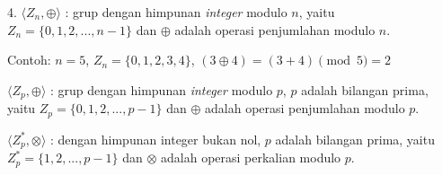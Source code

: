 \documentclass{article}
\begin{document}

4. $\langle Z_n, \oplus \rangle$ : grup dengan himpunan \textit{integer} modulo $n$, yaitu $Z_n = \{0, 1, 2, ..., n - 1\}$ dan $\oplus$ adalah operasi penjumlahan modulo $n$.

Contoh: $n = 5$, $Z_n = \{0, 1, 2, 3, 4\}$, $(3 \oplus 4) = (3 + 4) \pmod 5 = 2$

$\langle Z_p, \oplus \rangle$ : grup dengan himpunan \textit{integer} modulo $p$, $p$ adalah bilangan prima, yaitu $Z_p = \{0, 1, 2, ..., p - 1\}$ dan $\oplus$ adalah operasi penjumlahan modulo $p$.

$\langle Z_p^*, \otimes \rangle$ : dengan himpunan integer bukan nol, $p$ adalah bilangan prima, yaitu $Z_p^* = \{1, 2, ..., p - 1\}$ dan $\otimes$ adalah operasi perkalian modulo $p$.
\end{document}
